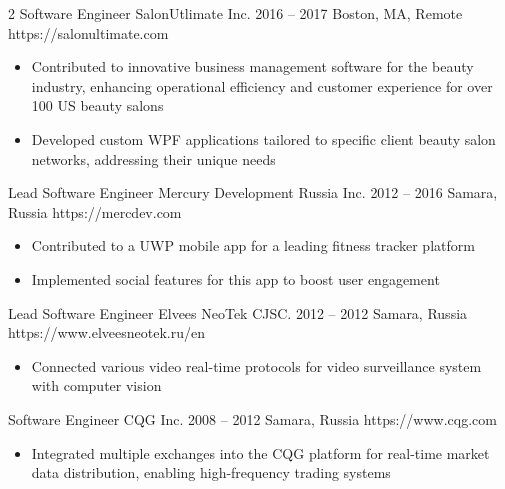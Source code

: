 \documentclass[9pt,a4paper]{igrmkcv}
\begin{document}
\begin{paracol}{2}
    \cvLeftEvent
        {Software Engineer}
        {SalonUtlimate Inc.}
        {2016 -- 2017}
        {Boston, MA, Remote}
        {https://salonultimate.com}

        \begin{itemize}
            \item Contributed to innovative business management software for the beauty industry,
                  enhancing operational efficiency and customer experience for over 100 US beauty salons
            \item Developed custom WPF applications tailored to specific client beauty salon networks,
                  addressing their unique needs
        \end{itemize}

    \cvLeftEvent
        {Lead Software Engineer}
        {Mercury Development Russia Inc.}
        {2012 -- 2016}
        {Samara, Russia}
        {https://mercdev.com}

        \begin{itemize}
            \item Contributed to a UWP mobile app for a leading fitness tracker platform
            \item Implemented social features for this app to boost user engagement
        \end{itemize}

    \cvLeftEvent
        {Lead Software Engineer}
        {Elvees NeoTek CJSC.}
        {2012 -- 2012}
        {Samara, Russia}
        {https://www.elveesneotek.ru/en}

        \begin{itemize}
            \item Connected various video real-time protocols for
                  video surveillance system with computer vision
        \end{itemize}

    \cvLeftEvent
        {Software Engineer}
        {CQG Inc.}
        {2008 -- 2012}
        {Samara, Russia}
        {https://www.cqg.com}

        \begin{itemize}
            \item Integrated multiple exchanges into the CQG platform for real-time market data distribution,
                  enabling high-frequency trading systems
        \end{itemize}

\newpage
\switchcolumn


\end{paracol}
\end{document}
